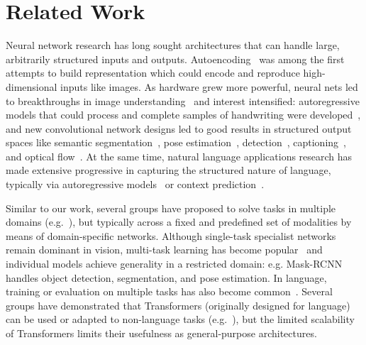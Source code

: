 \documentclass{article} %
\begin{document}
\section{Related Work}

Neural network research has long sought architectures that can handle large, arbitrarily structured inputs and outputs. Autoencoding~\citep{hinton1994autoencoders} was among the first attempts to build representation which could encode and reproduce high-dimensional inputs like images. As hardware grew more powerful, neural nets led to breakthroughs in image understanding~\citep{krizhevsky2012imagenet, zeiler2014visualizing, szegedy2015going} and interest intensified: autoregressive models that could process and complete samples of handwriting were developed~\citep{graves2013generating}, and new convolutional network designs led to good results in structured output spaces like semantic segmentation~\citep{farabet2012learning,long2015fully,ronnenberger2015convolutional}, pose estimation~\citep{toshev2014deep}, detection~\citep{sermanet2014overfeat}, captioning~\citep{you2016image}, and optical flow~\citep{fischer2015flownet}. At the same time, natural language applications research has made extensive progressive in capturing the structured nature of language, typically via autoregressive models~\citep{collobert2011natural,sutskever2014sequence,vaswani2017attention,radford2019language, brown2020language} or context prediction~\citep{mikolov2013distributed, pennington2014glove, devlin2019bert}.

Similar to our work, several groups have proposed to solve tasks in multiple domains (e.g.~\citealt{kaiser2017one, alayrac2020self,akbari2021vatt}), but typically across a fixed and predefined set of modalities by means of domain-specific networks. Although single-task specialist networks remain dominant in vision, multi-task learning has become popular~\citep{misra2016cross,doersch2017multi,kokkinos2017ubernet,zamir2018taskonomy} and individual models achieve generality in a restricted domain: e.g. Mask-RCNN~\citep{he2017mask} handles object detection, segmentation, and pose estimation. In language, training or evaluation on multiple tasks has also become common~\citep{collobert2008unified,luong2015multi,devlin2019bert,liu2019roberta, raffell2020exploring}. Several groups have demonstrated that Transformers (originally designed for language) can be used or adapted to non-language tasks (e.g.~\citealt{chen2020generative, lu2021pretrained}), but the limited scalability of Transformers limits their usefulness as general-purpose architectures. 
\end{document}
